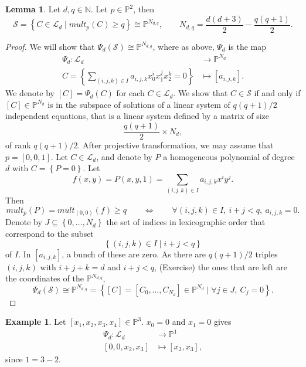 \documentclass{article}
\newcommand{\N}{\mathbb{N}}
\renewcommand{\P}{\mathbb{P}}
\renewcommand{\L}{\mathcal{L}}
\renewcommand{\S}{\mathcal{S}}
\newcommand{\rb}[1]{\left( #1 \right)}
\renewcommand{\sb}[1]{\left[ #1 \right]}
\newcommand{\cb}[1]{\left\{ #1 \right\}}
\theoremstyle{definition}\newtheorem{definition}{Definition}[section]
\theoremstyle{definition}\newtheorem{notation}[definition]{Notation}
\theoremstyle{definition}\newtheorem{remark}[definition]{Remark}
\theoremstyle{definition}\newtheorem{example1}[definition]{Example}
\theoremstyle{definition}\newtheorem{fact}{Fact}
\theoremstyle{definition}\newtheorem{exercise}{Exercise}
\theoremstyle{definition}\newtheorem*{example2}{Example}
\newtheorem{lemma}[definition]{Lemma}
\begin{document}
\begin{lemma}
\label{lem:14.6}
Let $ d, q \in \N $. Let $ p \in \P^2 $, then
$$ \S = \cb{C \in \L_d \mid mult_p\rb{C} \ge q} \cong \P^{N_{d, q}}, \qquad N_{d, q} = \dfrac{d\rb{d + 3}}{2} - \dfrac{q\rb{q + 1}}{2}. $$
\end{lemma}

\begin{proof}
We will show that $ \Psi_d\rb{\S} \cong \P^{N_{d, q}} $, where as above, $ \Psi_d $ is the map
\begin{align*}
\Psi_d : \L_d & \to \P^{N_d} \\
C = \cb{\sum_{\rb{i, j, k} \in I} a_{i, j, k}x_0^ix_1^jx_2^k = 0} & \mapsto \sb{a_{i, j, k}}.
\end{align*}
We denote by $ \sb{C} = \Psi_d\rb{C} $ for each $ C \in \L_d $. We show that $ C \in \S $ if and only if $ \sb{C} \in \P^{N_d} $ is in the subspace of solutions of a linear system of $ q\rb{q + 1} / 2 $ independent equations, that is a linear system defined by a matrix of size
$$ \dfrac{q\rb{q + 1}}{2} \times N_d, $$
of rank $ q\rb{q + 1} / 2 $. After projective transformation, we may assume that $ p = \sb{0, 0, 1} $. Let $ C \in \L_d $, and denote by $ P $ a homogeneous polynomial of degree $ d $ with $ C = \cb{P = 0} $. Let
$$ f\rb{x, y} = P\rb{x, y, 1} =  \sum_{\rb{i, j, k} \in I} a_{i, j, k}x^iy^j. $$
Then
$$ mult_p\rb{P} = mult_{\rb{0, 0}}\rb{f} \ge q \qquad \iff \qquad \forall \rb{i, j, k} \in I, \ i + j < q, \ a_{i, j, k} = 0. $$
Denote by $ J \subseteq \cb{0, \dots, N_d} $ the set of indices in lexicographic order that correspond to the subset
$$ \cb{\rb{i, j, k} \in I \mid i + j < q} $$
of $ I $. In $ \sb{a_{i, j, k}} $, a bunch of these are zero. As there are $ q\rb{q + 1} / 2 $ triples $ \rb{i, j, k} $ with $ i + j + k = d $ and $ i + j < q $, (Exercise) the ones that are left are the coordinates of the $ \P^{N_{d, q}} $,
$$ \Psi_d\rb{\S} \cong \P^{N_{d, q}} = \cb{\sb{C} = \sb{C_0, \dots, C_{N_d}} \in \P^{N_d} \mid \forall j \in J, \ C_j = 0}. $$
\end{proof}

\begin{example2}
Let $ \sb{x_1, x_2, x_3, x_4} \in \P^3 $. $ x_0 = 0 $ and $ x_1 = 0 $ gives
\begin{align*}
\Psi_d : \L_d & \to \P^1 \\
\sb{0, 0, x_2, x_3} & \mapsto \sb{x_2, x_3},
\end{align*}
since $ 1 = 3 - 2 $.
\end{example2}
\end{document}
